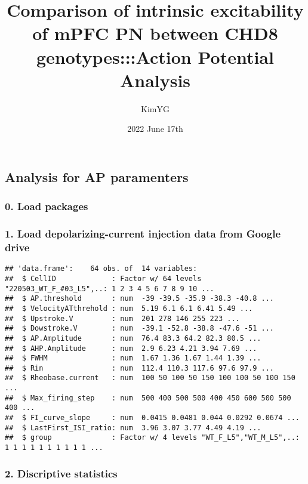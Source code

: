 \documentclass[
]{article}
\title{Comparison of intrinsic excitability of mPFC PN between CHD8
genotypes:::Action Potential Analysis}
\author{KimYG}
\date{2022 June 17th}
\begin{document}
\maketitle

\hypertarget{analysis-for-ap-paramenters}{%
\subsection{Analysis for AP
paramenters}\label{analysis-for-ap-paramenters}}

\hypertarget{load-packages}{%
\subsubsection{0. Load packages}\label{load-packages}}

\hypertarget{load-depolarizing-current-injection-data-from-google-drive}{%
\subsubsection{1. Load depolarizing-current injection data from Google
drive}\label{load-depolarizing-current-injection-data-from-google-drive}}

\begin{verbatim}
## 'data.frame':    64 obs. of  14 variables:
##  $ CellID             : Factor w/ 64 levels "220503_WT_F_#03_L5",..: 1 2 3 4 5 6 7 8 9 10 ...
##  $ AP.threshold       : num  -39 -39.5 -35.9 -38.3 -40.8 ...
##  $ VelocityATthrehold : num  5.19 6.1 6.1 6.41 5.49 ...
##  $ Upstroke.V         : num  201 278 146 255 223 ...
##  $ Dowstroke.V        : num  -39.1 -52.8 -38.8 -47.6 -51 ...
##  $ AP.Amplitude       : num  76.4 83.3 64.2 82.3 80.5 ...
##  $ AHP.Amplitude      : num  2.9 6.23 4.21 3.94 7.69 ...
##  $ FWHM               : num  1.67 1.36 1.67 1.44 1.39 ...
##  $ Rin                : num  112.4 110.3 117.6 97.6 97.9 ...
##  $ Rheobase.current   : num  100 50 100 50 150 100 100 50 100 150 ...
##  $ Max_firing_step    : num  500 400 500 500 400 450 600 500 500 400 ...
##  $ FI_curve_slope     : num  0.0415 0.0481 0.044 0.0292 0.0674 ...
##  $ LastFirst_ISI_ratio: num  3.96 3.07 3.77 4.49 4.19 ...
##  $ group              : Factor w/ 4 levels "WT_F_L5","WT_M_L5",..: 1 1 1 1 1 1 1 1 1 1 ...
\end{verbatim}

\hypertarget{discriptive-statistics}{%
\subsubsection{2. Discriptive statistics}\label{discriptive-statistics}}
\end{document}
